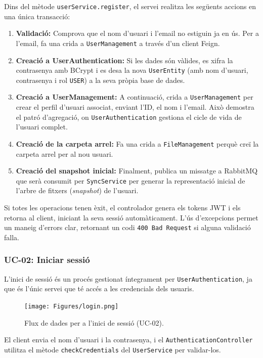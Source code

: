 Dins del mètode \texttt{userService.register}, el servei realitza les següents accions en una única transacció:
\begin{enumerate}
    \item \textbf{Validació:} Comprova que el nom d'usuari i l'email no estiguin ja en ús. Per a l'email, fa una crida a \texttt{UserManagement} a través d'un client Feign.
    \item \textbf{Creació a UserAuthentication:} Si les dades són vàlides, es xifra la contrasenya amb BCrypt i es desa la nova \texttt{UserEntity} (amb nom d'usuari, contrasenya i rol \texttt{USER}) a la seva pròpia base de dades.
    \item \textbf{Creació a UserManagement:} A continuació, crida a \texttt{UserManagement} per crear el perfil d'usuari associat, enviant l'ID, el nom i l'email. Això demostra el patró d'agregació, on \texttt{UserAuthentication} gestiona el cicle de vida de l'usuari complet.
    \item \textbf{Creació de la carpeta arrel:} Fa una crida a \texttt{FileManagement} perquè creï la carpeta arrel per al nou usuari.
    \item \textbf{Creació del snapshot inicial:} Finalment, publica un missatge a RabbitMQ que serà consumit per \texttt{SyncService} per generar la representació inicial de l'arbre de fitxers (\textit{snapshot}) de l'usuari.
\end{enumerate}
Si totes les operacions tenen èxit, el controlador genera els tokens JWT i els retorna al client, iniciant la seva sessió automàticament. L'ús d'excepcions permet un maneig d'errors clar, retornant un codi \texttt{400 Bad Request} si alguna validació falla.

\subsubsection{UC-02: Iniciar sessió}

L'inici de sessió és un procés gestionat íntegrament per \texttt{UserAuthentication}, ja que és l'únic servei que té accés a les credencials dels usuaris.

\begin{figure}[H]
    \centering
    \texttt{[image: Figures/login.png]}
    \caption{Flux de dades per a l'inici de sessió (UC-02).}
\end{figure}

El client envia el nom d'usuari i la contrasenya, i el \texttt{AuthenticationController} utilitza el mètode \texttt{checkCredentials} del \texttt{UserService} per validar-los.

